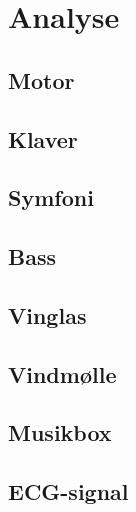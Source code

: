 \chapter{Analyse}\label{ch:analyse}



\section{Motor}

\section{Klaver}

\section{Symfoni}

\section{Bass}

\section{Vinglas}

\section{Vindmølle}

\section{Musikbox}

\section{ECG-signal}
